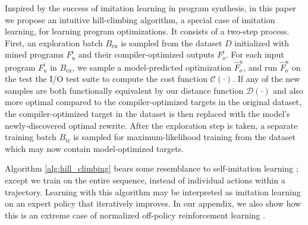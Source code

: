 \documentclass{article}
\begin{document}


Inspired by the success of imitation learning in program synthesis, in this paper we propose an intuitive hill-climbing algorithm, a special case of imitation learning, for learning program optimizations. 
It consists of a two-step process. 
First, an exploration batch $B_{\mathrm{ex}}$ is sampled from the dataset $D$ initialized with mined programs $F^i_u$ and their compiler-optimized outputs $F^i_o$. 
For each input program $F^i_u$ in $B_{\mathrm{ex}}$, we sample a model-predicted optimization $\hat{F}^u_o$, and run $\hat{F}^u_o$ on the test the I/O test suite to compute the cost function $\mathcal{C}(\cdot)$.
If any of the new samples are both functionally equivalent by our distance function $\mathcal{D}(\cdot)$ and also more optimal compared to the compiler-optimized targets in the original dataset, the compiler-optimized target in the dataset is then replaced with the model's newly-discovered optimal rewrite. 
After the exploration step is taken, a separate training batch $B_{\mathrm{tr}}$ is sampled for maximum-likelihood training from the dataset which may now contain model-optimized targets. 

Algorithm \ref{alg:hill_climbing} bears some resemblance to self-imitation learning \cite{oh2018self} ; except we train on the entire sequence, instead of individual actions within a trajectory. Learning with this algorithm may be interpreted as imitation learning on an expert policy that iteratively improves. In our appendix, we also show how this is an extreme case of normalized off-policy reinforcement learning . 
\end{document}
